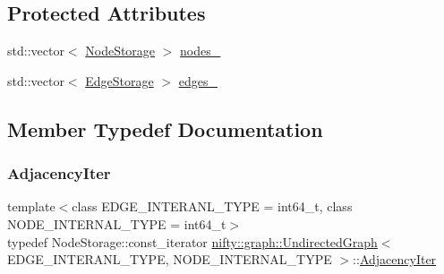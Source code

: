 \subsection*{Protected Attributes}
\begin{DoxyCompactItemize}
\item 
std\+::vector$<$ \hyperlink{classnifty_1_1graph_1_1UndirectedGraph_a6e9a6dd89601d6f9039492053dc9f2a8}{Node\+Storage} $>$ \hyperlink{classnifty_1_1graph_1_1UndirectedGraph_a4e12e37bede71b7beaca9fdbc7dd9abc}{nodes\+\_\+}
\item 
std\+::vector$<$ \hyperlink{classnifty_1_1graph_1_1UndirectedGraph_a77256cc943f931180bf84b14d943f39a}{Edge\+Storage} $>$ \hyperlink{classnifty_1_1graph_1_1UndirectedGraph_adc3e4d3dc0f8bff661042af2a05d342f}{edges\+\_\+}
\end{DoxyCompactItemize}


\subsection{Member Typedef Documentation}
\mbox{\label{classnifty_1_1graph_1_1UndirectedGraph_adecb4597d23d097b08c2c03a106bc57b}} 
\subsubsection{\texorpdfstring{Adjacency\+Iter}{AdjacencyIter}}
{\footnotesize\ttfamily template$<$class E\+D\+G\+E\+\_\+\+I\+N\+T\+E\+R\+A\+N\+L\+\_\+\+T\+Y\+PE = int64\+\_\+t, class N\+O\+D\+E\+\_\+\+I\+N\+T\+E\+R\+N\+A\+L\+\_\+\+T\+Y\+PE = int64\+\_\+t$>$ \\
typedef Node\+Storage\+::const\+\_\+iterator \hyperlink{classnifty_1_1graph_1_1UndirectedGraph}{nifty\+::graph\+::\+Undirected\+Graph}$<$ E\+D\+G\+E\+\_\+\+I\+N\+T\+E\+R\+A\+N\+L\+\_\+\+T\+Y\+PE, N\+O\+D\+E\+\_\+\+I\+N\+T\+E\+R\+N\+A\+L\+\_\+\+T\+Y\+PE $>$\+::\hyperlink{classnifty_1_1graph_1_1UndirectedGraph_adecb4597d23d097b08c2c03a106bc57b}{Adjacency\+Iter}}

\mbox{\label{classnifty_1_1graph_1_1UndirectedGraph_a2f74e8de961bf80dc037ceedf58c46a4}} 
